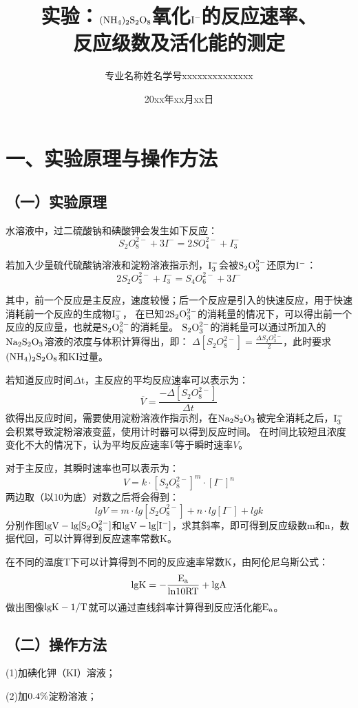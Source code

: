 \documentclass[a4paper,12pt]{article}
\title{\heiti\zihao{2} 实验：$\rm (NH_4)_2S_2O_8$氧化$\rm I^-$的反应速率、\\反应级数及活化能的测定}
\author{专业名称\quad 姓\;名\quad 学号xxxxxxxxxxxxxx}
\date{20xx年xx月xx日}
\begin{document}
\maketitle

\setcounter{section}{0}
\section*{一、实验原理与操作方法}
\subsection*{（一）实验原理}
水溶液中，过二硫酸钠和碘酸钾会发生如下反应：
$$
S_2O_8^{2-}+3I^-=2SO_4^{2-}+I_3^-
$$

若加入少量硫代硫酸钠溶液和淀粉溶液指示剂，$\rm I_3^-$会被$\rm S_2O_3^{2-}$还原为$\rm I^-$：
$$
2S_2O_3^{2-}+I_3^-=S_4O_6^{2-}+3I^-
$$

其中，前一个反应是主反应，速度较慢；后一个反应是引入的快速反应，用于快速消耗前一个反应的生成物$\rm I_3^-$，
在已知$\rm 2S_2O_3^{2-}$的消耗量的情况下，可以得出前一个反应的反应量，也就是$\rm S_2O_8^{2-}$的消耗量。
$\rm S_2O_3^{2-}$的消耗量可以通过所加入的$\rm Na_2S_2O_3$溶液的浓度与体积计算得出，即：
$\Delta [S_2O_8^{2-}]=\frac{\Delta S_2O_3^{2-}}{2}$，此时要求$\rm (NH_4)_2S_2O_8$和KI过量。

若知道反应时间$\Delta$t，主反应的平均反应速率可以表示为：
$$
\overline{V}=\frac{-\Delta [S_2O_8^{2-}]}{\Delta t}
$$
欲得出反应时间，需要使用淀粉溶液作指示剂，在$\rm Na_2S_2O_3$被完全消耗之后，$\rm I_3^-$会积累导致淀粉溶液变蓝，使用计时器可以得到反应时间。
在时间比较短且浓度变化不大的情况下，认为平均反应速率$\overline{V}$等于瞬时速率$V$。

对于主反应，其瞬时速率也可以表示为：
$$
V = k\cdot [S_2O_8^{2-}]^m\cdot [I^-]^n
$$
两边取（以10为底）对数之后将会得到：
$$
lgV=m\cdot lg[S_2O_8^{2-}] + n\cdot lg[I^-] + lgk
$$
分别作图$\rm lgV-lg[S_2O_8^{2-}]$和$\rm lgV-lg[I^-]$，求其斜率，即可得到反应级数m和n，数据代回，可以计算得到反应速率常数K。

在不同的温度T下可以计算得到不同的反应速率常数K，由阿伦尼乌斯公式：
$$\rm lgK=-\frac{E_a}{ln10RT}+lgA$$
做出图像$\rm lgK-1/T$就可以通过直线斜率计算得到反应活化能$\rm E_a$。

\subsection*{（二）操作方法}
(1)加碘化钾（KI）溶液；

(2)加$\rm 0.4\%$淀粉溶液；
\end{document}
